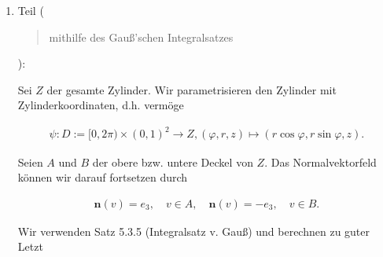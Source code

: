 \begin{solution}
\begin{enumerate}
    \item Teil (\blockquote{mithilfe des Gauß'schen Integralsatzes}):
    
    Sei $Z$ der gesamte Zylinder.
    Wir parametrisieren den Zylinder mit Zylinderkoordinaten, d.h. vermöge

    \begin{align*}
        \psi:
            D := [0, 2 \pi) \times (0, 1)^2 \to Z,
            (\varphi, r, z) \mapsto (r \cos \varphi, r \sin \varphi, z).
    \end{align*}

    Seien $A$ und $B$ der obere bzw. untere Deckel von $Z$.
    Das Normalvektorfeld können wir darauf fortsetzen durch

    \begin{align*}
        \mathbf n(v) =  e_3,
        \quad
        v \in A,
        \quad
        \mathbf n(v) = -e_3,
        \quad
        v \in B.
    \end{align*}


    Wir verwenden Satz 5.3.5 (Integralsatz v. Gauß) und berechnen zu guter Letzt


\end{enumerate}
\end{solution}
